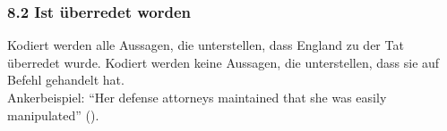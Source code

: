 \documentclass[12pt, titlepage=true, toc=bib]{scrartcl}
\begin{document}
\subsubsection*{8.2 Ist überredet worden}

Kodiert werden alle Aussagen, die unterstellen, dass England zu der Tat überredet wurde. Kodiert werden keine Aussagen, die unterstellen, dass sie auf Befehl gehandelt hat.\\
Ankerbeispiel: "`Her defense attorneys maintained that she was easily manipulated"' (\cite[1]{gerstenzang_female_2005}).
\end{document}
